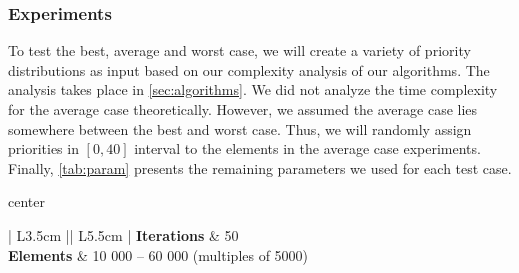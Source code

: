 \documentclass[a4paper,11pt]{kth-mag}
\begin{document}
\subsubsection{Experiments}
To test the best, average and worst case, we will create a variety of priority distributions as input based on our complexity analysis of our algorithms. The analysis takes place in \cref{sec:algorithms}.
We did not analyze the time complexity for the average case theoretically.
However, we assumed the average case lies somewhere between the best and worst case.
Thus, we will randomly assign priorities in $[0, 40]$ interval to the elements in the average case experiments.
Finally, \cref{tab:param} presents the remaining parameters we used for each test case.


\begin{table}
    \small
    \caption{Experiment parameters for each implementation and test case}
    \label{tab:param}
    \begin{adjustbox}{center}
        \renewcommand*\arraystretch{1.2}\begin{tabular}{| L{3.5cm} || L{5.5cm} |}
            \hline
            \textbf{Iterations} & 50
            \\ \hline
            \textbf{Elements} & 10 000 -- 60 000 (multiples of 5000)
            \\ \hline
        \end{tabular}
    \end{adjustbox}
\end{table}
\end{document}
